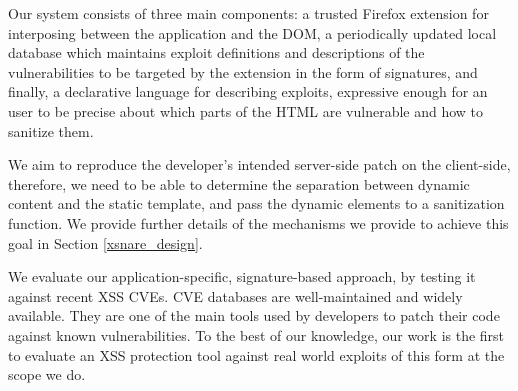Our system consists of three main components: a trusted Firefox
extension for interposing between the application and the DOM, a
periodically updated local database which maintains exploit
definitions and descriptions of the vulnerabilities to be targeted by
the extension in the form of signatures, and finally, a declarative
language for describing exploits, expressive enough for an user to be
precise about which parts of the HTML are vulnerable and how to
sanitize them.

We aim to reproduce the developer's intended server-side patch on the
client-side, therefore, we need to be able to determine the separation
between dynamic content and the static template, and pass the dynamic
elements to a sanitization function. We provide further details of the
mechanisms we provide to achieve this goal in Section
\ref{xsnare_design}.

We evaluate our application-specific, signature-based approach, by
testing it against recent XSS CVEs. CVE databases are well-maintained
and widely available. They are one of the main tools used by
developers to patch their code against known vulnerabilities. To the
best of our knowledge, our work is the first to evaluate an XSS
protection tool against real world exploits of this form at the scope
we do.


